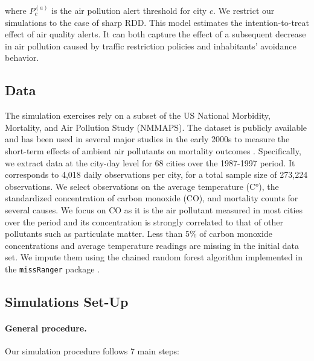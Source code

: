 \documentclass[12pt]{article}
\begin{document}
        \noindent where $P^{(a)}_{c}$ is the air pollution alert threshold for city $c$. We restrict our simulations to the case of sharp RDD. This model estimates the intention-to-treat effect of air quality alerts.  It can both capture the effect of a subsequent decrease in air pollution caused by traffic restriction policies and inhabitants' avoidance behavior. 
        
        \subsection{Data}
        
        The simulation exercises rely on a subset of the US National Morbidity, Mortality, and Air Pollution Study (NMMAPS). The dataset is publicly available and has been used in several major studies in the early 2000s to measure the short-term effects of ambient air pollutants on mortality outcomes \citep{peng2008statistical}. Specifically, we extract data at the city-day level for 68 cities over the 1987-1997 period. It corresponds to 4,018 daily observations per city, for a total sample size of 273,224 observations. We select observations on the average temperature (C°), the standardized concentration of carbon monoxide (CO), and mortality counts for several causes. We focus on CO as it is the air pollutant measured in most cities over the period and its concentration is strongly correlated to that of other pollutants such as particulate matter. Less than 5\% of carbon monoxide concentrations and average temperature readings are missing in the initial data set. We impute them using the chained random forest algorithm implemented in the \texttt{missRanger} package \citep{mayer_missranger_2019}.
        
        \subsection{Simulations Set-Up}
        
        \paragraph{General procedure.} Our simulation procedure follows 7 main steps:
        
\end{document}
